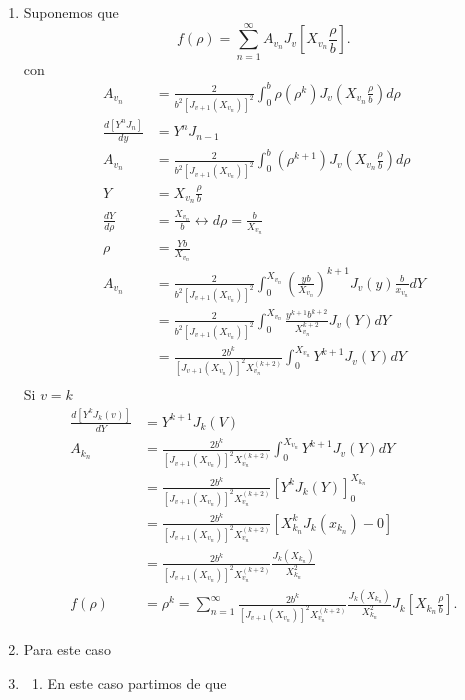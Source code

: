 \begin{enumerate}
    \item Suponemos que \[
    f\left( \rho \right) = \sum_{n=1}^{\infty} A_{v_n} J_v\left[ X_{v_n}\frac{\rho}{b} \right] 	
    .\] con
    \begin{align*}
      A_{v_n} &= \frac{2}{b^2\left[ J_{v + 1}\left( X_{v_n} \right) \right]^2}\int_{0}^{b}\rho\left( \rho^{k} \right) J_v\left( X_{v_n}\frac{\rho}{b} \right) d\rho\\
      \frac{d\left[ Y^{n}J_n \right] }{dy} &= Y^{n}J_{n - 1}\\
      A_{v_n} &= \frac{2}{b^2\left[ J_{v + 1}\left( X_{v_n} \right) \right]^2}\int_{0}^{b}\left( \rho^{k + 1} \right) J_v\left( X_{v_n}\frac{\rho}{b} \right) d\rho\\
      Y &= X_{v_n}\frac{\rho}{b} \\
      \frac{dY}{d\rho} &= \frac{X_{v_n}}{b} \leftrightarrow d\rho = \frac{b}{X_{v_n}} \\
      \rho &= \frac{Y b}{X_{v_n}} \\
      A_{v_n} &= \frac{2}{b^2\left[ J_{v + 1}\left( X_{v_n} \right)  \right]^2}\int_0^{X_{v_n}}\left( \frac{yb}{X_{v_n}} \right)^{k + 1}J_{v}\left( y \right) \frac{b}{x_{v_n}}dY\\
	      &= \frac{2}{b^2 \left[ J_{v+1}\left( X_{v_n} \right)  \right]^2}\int_{0}^{X_{v_n}}\frac{y^{k + 1}b^{k + 2}}{X_{v_n}^{k + 2}}J_v\left( Y \right) dY \\
	      &= \frac{2b^{k}}{\left[ J_{v+1}\left( X_{v_n} \right)  \right]^2 X_{v_n}^{(k + 2)} }\int_0^{X_{v_n}}Y^{k + 1}J_v\left( Y \right) dY \\
    \end{align*}
    Si $v = k$
    \begin{align*}
      \frac{d\left[ Y^{k}J_k\left( v \right)  \right] }{dY} &= Y^{k + 1}J_{k}\left( V \right)  \\
      A_{k_n} &= \frac{2b^{k}}{\left[ J_{v+1}\left( X_{v_n} \right)  \right]^2 X_{v_n}^{(k + 2)} }\int_0^{X_{v_n}}Y^{k + 1}J_v\left( Y \right) dY \\
      &= \frac{2b^{k}}{\left[ J_{v+1}\left( X_{v_n} \right)  \right]^2 X_{v_n}^{(k + 2)} }\left[ Y^{k}J_k\left( Y \right) \right]_0^{X_{k_n}}\\
      &=  \frac{2b^{k}}{\left[ J_{v+1}\left( X_{v_n} \right)  \right]^2 X_{v_n}^{(k + 2)} }  \left[ X_{k_n}^{k}J_k\left( x_{k_n} \right) - 0 \right] \\
      &= \frac{2b^{k}}{\left[ J_{v+1}\left( X_{v_n} \right)  \right]^2 X_{v_n}^{(k + 2)} } \frac{J_k\left( X_{k_n} \right) }{X^2_{k_n}} \\
      f\left( \rho \right) &= \rho^{k} = \sum_{n=1}^{\infty} \frac{2b^{k}}{\left[ J_{v+1}\left( X_{v_n} \right)  \right]^2 X_{v_n}^{(k + 2)} }\frac{J_k\left( X_{k_n} \right) }{X^2_{k_n}} J_k \left[ X_{k_n} \frac{\rho}{b} \right] 
    .\end{align*}
    \item Para este caso
    \item 
      \begin{enumerate}
        \item En este caso partimos de que 
      \end{enumerate}
    \end{enumerate}

